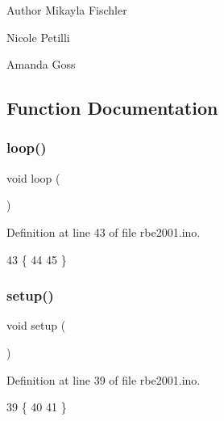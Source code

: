 \begin{DoxyAuthor}{Author}
Mikayla Fischler 

Nicole Petilli 

Amanda Goss 
\end{DoxyAuthor}


\subsection{Function Documentation}
\mbox{\label{rbe2001_8ino_afe461d27b9c48d5921c00d521181f12f}} 
\subsubsection{\texorpdfstring{loop()}{loop()}}
{\footnotesize\ttfamily void loop (\begin{DoxyParamCaption}{ }\end{DoxyParamCaption})}



Definition at line 43 of file rbe2001.\+ino.


\begin{DoxyCode}
43              \{
44 
45 \}
\end{DoxyCode}
\mbox{\label{rbe2001_8ino_a4fc01d736fe50cf5b977f755b675f11d}} 
\subsubsection{\texorpdfstring{setup()}{setup()}}
{\footnotesize\ttfamily void setup (\begin{DoxyParamCaption}{ }\end{DoxyParamCaption})}



Definition at line 39 of file rbe2001.\+ino.


\begin{DoxyCode}
39               \{
40 
41 \}
\end{DoxyCode}

